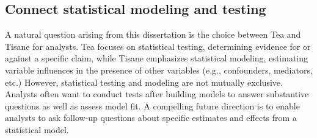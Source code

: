 \subsection{Connect statistical modeling and testing} 
\begin{comment}
A natural question to ask at the end of this thesis is, ``Which system should an
analyst use? Tea or Tisane?'' Tea and Tisane serve different statistical
purposes. Tea is focused on statistical testing, or finding if there is evidence
in the data for or against a specific claim, while Tisane is focused on
statistical modeling, trying to estimate the influence of a variable (or sets of
variables) on another variable, given the messy nature of the world, including
confounding, mediation, moderation, etc. Statistical testing and modeling are
not mutually exclusive. In fact, statistical experts often perform statistical
tests after building statistical models. Mathematically, all statistical tests
can be reformulated into statistical models with specific parameters of interest
serving as test statistics (see~\cite{} for an approachable summary). 

What we have observed in our studies and personal experiences is that analysts
often reach for statistical tests even when what they really need is a
statistical model. Analysts will even contort their research questions to fit
the (sub-optimal) statistical tests they can implement, just as we saw in
hypothesis formalization. 

Tea and Tisane do not address a key limitation of the current ecosystem of
statistical software, which is guidance in what analysis approach to take. A
compelling next step in this work is to allow analysts to ask follow-up queries
after authoring a statistical model to probe into what its implications are and
test the differences between groups given a model. To make this possible,
additional querying and disambiguation after outputting a statistical model from
Tisane are necessary. What would make this difficult is...
\end{comment}

A natural question arising from this dissertation is the choice between Tea and
Tisane for analysts. Tea focuses on statistical testing, determining evidence
for or against a specific claim, while Tisane emphasizes statistical modeling,
estimating variable influences in the presence of other variables (e.g.,
confounders, mediators, etc.) However, statistical testing and modeling are not
mutually exclusive. Analysts often want to conduct tests after building models
to answer substantive questions as well as assess model fit. A compelling future
direction is to enable analysts to ask follow-up questions about specific
estimates and effects from a statistical model. 

